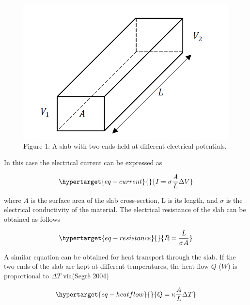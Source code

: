 \documentclass[
  letterpaper,
  DIV=11,
  numbers=noendperiod]{scrreprt}
\begin{document}
\begin{figure}

{\centering \includegraphics{./images/conductor.png}

}

\caption{\label{fig-conductor}Figure 1: A slab with two ends held at
different electrical potentials.}

\end{figure}

In this case the electrical current can be expressed as

\begin{equation}\protect\hypertarget{eq-current}{}{I = \sigma\frac{A}{L}\Delta V}\label{eq-current}\end{equation}

where \(A\) is the surface area of the slab cross-section, L is its
length, and \(\sigma\) is the electrical conductivity of the material.
The electrical resistance of the slab can be obtained as follows

\begin{equation}\protect\hypertarget{eq-resistance}{}{R = \frac{L}{\sigma A}}\label{eq-resistance}\end{equation}

A similar equation can be obtained for heat transport through the slab.
If the two ends of the slab are kept at different temperatures, the heat
flow \({Q}\) (\({W}\)) is proportional to \(\Delta T\) via(Segrè 2004)

\begin{equation}\protect\hypertarget{eq-heatflow}{}{{Q} = \kappa\frac{A}{L}\Delta T}\label{eq-heatflow}\end{equation}
\end{document}
